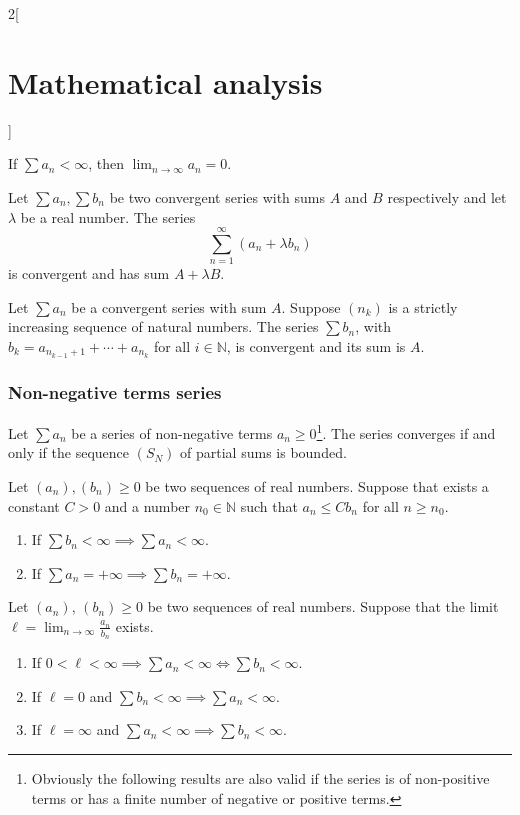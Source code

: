 \documentclass[../../../main.tex]{subfiles}
\begin{document}
\begin{multicols}{2}[\section{Mathematical analysis}]
\begin{corollary}
If $\sum a_n<\infty$, then $\displaystyle\lim_{n\to \infty} a_n=0$.
\end{corollary}
\begin{theorem}[Linearity]
Let $\sum a_n,\sum b_n$ be two convergent series with sums $A$ and $B$ respectively and let $\lambda$ be a real number. The series $$\sum_{n=1}^\infty (a_n+\lambda b_n)$$ is convergent and has sum $A+\lambda B$.
\end{theorem}
\begin{theorem}
Let $\sum a_n$ be a convergent series with sum $A$. Suppose $(n_k)$ is a strictly increasing sequence of natural numbers. The series $\sum b_n$, with $b_k=a_{n_{k-1}+1}+\cdots+a_{n_k}$ for all $i\in\mathbb{N}$, is convergent and its sum is $A$.
\end{theorem}
\subsubsection*{Non-negative terms series}
\begin{theorem}
Let $\sum a_n$ be a series of non-negative terms $a_n\geq 0$\footnote{Obviously the following results are also valid if the series is of non-positive terms or has a finite number of negative or positive terms.}. The series converges if and only if the sequence $(S_N)$ of partial sums is bounded.
\end{theorem}
\begin{theorem}
Let $(a_n),(b_n)\geq 0$ be two sequences of real numbers. Suppose that exists a constant $C>0$ and a number $n_0\in\mathbb{N}$ such that $a_n\leq Cb_n$ for all $n\geq n_0$.
\begin{enumerate}
    \item If $\sum b_n<\infty\implies\sum a_n<\infty$.
    \item If $\sum a_n=+\infty\implies\sum b_n=+\infty$.
\end{enumerate}
\end{theorem}
\begin{theorem}
Let $(a_n)$, $(b_n)\geq 0$ be two sequences of real numbers. Suppose that the limit $\ell=\displaystyle\lim_{n\to\infty}\frac{a_n}{b_n}$ exists.
\begin{enumerate}
    \item If $0<\ell<\infty\implies\sum a_n<\infty\iff\sum b_n<\infty$.
    \item If $\ell=0$ and $\sum b_n<\infty\implies\sum a_n<\infty$.
    \item If $\ell=\infty$ and $\sum a_n<\infty\implies\sum b_n<\infty$.

\end{enumerate}
\end{theorem}
\end{multicols}
\end{document}
